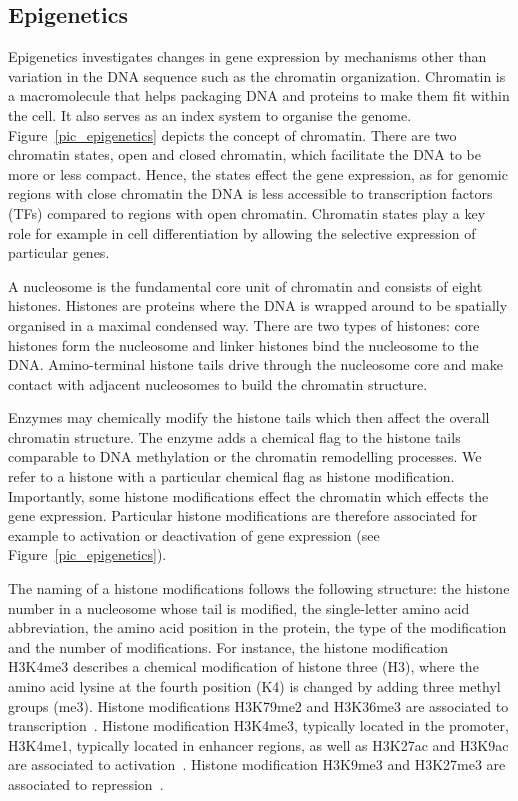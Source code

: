 \subsection{Epigenetics}
\label{sec_epigenetics}
Epigenetics investigates changes in gene expression by mechanisms other than variation in the DNA sequence such as the chromatin organization.
Chromatin is a macromolecule that helps packaging DNA and proteins to make them fit within the cell.
It also serves as an index system to organise the genome.
Figure~\ref{pic_epigenetics} depicts the concept of chromatin.
There are two chromatin states, open and closed chromatin, which facilitate the DNA to be more or less compact.
Hence, the states effect the gene expression, as for genomic regions with close chromatin the DNA is less accessible to transcription factors (TFs) compared to regions with open chromatin. 
Chromatin states play a key role for example in cell differentiation by allowing the selective expression of particular genes.

A nucleosome is the fundamental core unit of chromatin and consists of eight histones.
Histones are proteins where the DNA is wrapped around to be spatially organised in a maximal condensed way.
There are two types of histones: core histones form the nucleosome and linker histones bind the nucleosome to the DNA.
Amino-terminal histone tails drive through the nucleosome core and make contact with adjacent nucleosomes to build the chromatin structure.

Enzymes may chemically modify the histone tails which then affect the overall chromatin structure.
The enzyme adds a chemical flag to the histone tails comparable to DNA methylation or the chromatin remodelling processes.
We refer to a histone with a particular chemical flag as histone modification.
Importantly, some histone modifications effect the chromatin which effects the gene expression.
Particular histone modifications are therefore associated for example to activation or deactivation of gene expression (see Figure~\ref{pic_epigenetics}).

The naming of a histone modifications follows the following structure: the histone number in a nucleosome whose tail is modified, the single-letter amino acid abbreviation, the amino acid position in the protein, the type of the modification and the number of modifications.
For instance, the histone modification H3K4me3 describes a chemical modification of histone three (H3), where the amino acid lysine at the fourth position (K4) is changed by adding three methyl groups (me3).
Histone modifications H3K79me2 and H3K36me3 are associated to transcription~\citep{Nguyen2011, Sims2099}.
Histone modification H3K4me3, typically located in the promoter, H3K4me1, typically located in enhancer regions, as well as H3K27ac and H3K9ac are associated to activation~\citep{Briggs2001, Creyghton2010, Grant1999}.
Histone modification H3K9me3 and H3K27me3 are associated to repression~\citep{Cao2002}.

